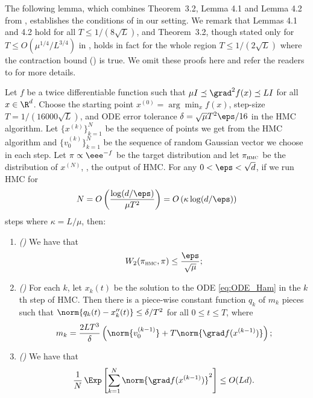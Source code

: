 The following lemma, which combines Theorem~3.2, Lemma 4.1 and Lemma 4.2 from \cite{LSV18}, establishes the conditions of  in our setting. We remark that Lemmas 4.1 and 4.2 hold for all $T \le 1/(8\sqrt{L})$, and Theorem~3.2, though stated only for $T \le O(\mu^{1/4}/L^{3/4})$ in \cite{LSV18}, holds in fact for the whole region $T \le 1/(2\sqrt{L})$ where the contraction bound () is true. We omit these proofs here and refer the readers to \cite{LSV18} for more details.

\begin{lemma}\label{lem:ODE_prep}
	Let $f$ be a twice differentiable function such that $\mu I \preceq \grad^2 f(x) \preceq LI$ for all $x\in \R^d$. Choose the starting point $x^{(0)} = \arg\min_x f(x)$, step-size $T = 1/(16000\sqrt{L})$, and ODE error tolerance $\delta = \sqrt{\mu}T^2 \eps/16$ in the HMC algorithm. Let $\{x^{(k)}\}_{k=1}^N$ be the sequence of points we get from the HMC algorithm and $\{v_0^{(k)}\}_{k=1}^N$ be the sequence of random Gaussian vector we choose in each step. Let $\pi \propto \eee^{-f}$ be the target distribution and let $\pi_{\textsc{hmc}}$ be the distribution of $x^{(N)}$, \ie, the output of HMC. For any $0<\eps<\sqrt{d}$, if we run HMC for 
	\begin{equation}
	N = O\left( \frac{\log(d/\eps)}{\mu T^2} \right) = O\left( \kappa \log(d/\eps) \right)
	\end{equation}
	steps where $\kappa = L/\mu$, then:
	\begin{enumerate}
		\item \emph{(\cite[Theorem 3.2]{LSV18})} We have that
		\begin{equation}
		W_2(\pi_{\textsc{hmc}},\pi) \le \frac{\eps}{\sqrt{\mu}};
		\end{equation}
		\item \emph{(\cite[Lemma 4.1]{LSV18})} For each $k$, let $x_k(t)$ be the solution to the ODE \eqref{eq:ODE_Ham} in the $k$th step of HMC. Then there is a piece-wise constant function $q_k$ of $m_k$ pieces such that $\norm{q_k(t)-x_k''(t)} \le \delta/T^2$ for all $0\le t\le T$, where
		\begin{equation}
		m_k = \frac{2LT^3}{\delta}\left( \norm{v_0^{(k-1)}} + T\norm{\grad f(x^{(k-1)})} \right);
		\end{equation}
		\item \emph{(\cite[Lemma 4.2]{LSV18})} We have that
		\begin{equation}
		\frac{1}{N}\, \Exp\left[ \sum_{k=1}^{N} \norm{\grad f(x^{(k-1)})}^2 \right] \le O(Ld).
		\end{equation}
	\end{enumerate}		
\end{lemma}


